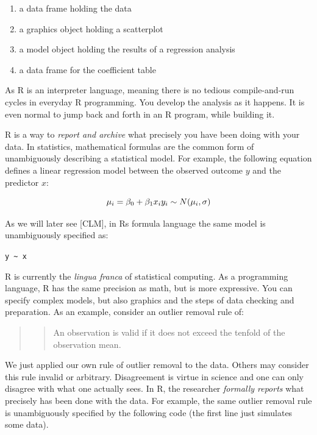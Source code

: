 \documentclass[]{svmono}
\providecommand{\tightlist}{%
  \setlength{\itemsep}{0pt}\setlength{\parskip}{0pt}}
\theoremstyle{definition}
\theoremstyle{definition}
\theoremstyle{definition}
\theoremstyle{remark}
\begin{document}
\begin{enumerate}
\def\labelenumi{\arabic{enumi}.}
\tightlist
\item
  a data frame holding the data
\item
  a graphics object holding a scatterplot
\item
  a model object holding the results of a regression analysis
\item
  a data frame for the coefficient table
\end{enumerate}

As R is an interpreter language, meaning there is no tedious
compile-and-run cycles in everyday R programming. You develop the
analysis as it happens. It is even normal to jump back and forth in an R
program, while building it.

R is a way to \emph{report and archive} what precisely you have been
doing with your data. In statistics, mathematical formulas are the
common form of unambiguously describing a statistical model. For
example, the following equation defines a linear regression model
between the observed outcome \(y\) and the predictor \(x\):

\[
\mu_i = \beta_0 +  \beta_1x_i\\
y_i \sim N(\mu_i, \sigma)
\]

As we will later see {[}CLM{]}, in Rs formula language the same model is
unambiguously specified as:

\texttt{y\ \textasciitilde{}\ x}

R is currently the \emph{lingua franca} of statistical computing. As a
programming language, R has the same precision as math, but is more
expressive. You can specify complex models, but also graphics and the
steps of data checking and preparation. As an example, consider an
outlier removal rule of:

\begin{quote}
\begin{quote}
An observation is valid if it does not exceed the tenfold of the
observation mean.
\end{quote}
\end{quote}

We just applied our own rule of outlier removal to the data. Others may
consider this rule invalid or arbitrary. Disagreement is virtue in
science and one can only disagree with what one actually sees. In R, the
researcher \emph{formally reports} what precisely has been done with the
data. For example, the same outlier removal rule is unambiguously
specified by the following code (the first line just simulates some
data).
\end{document}
